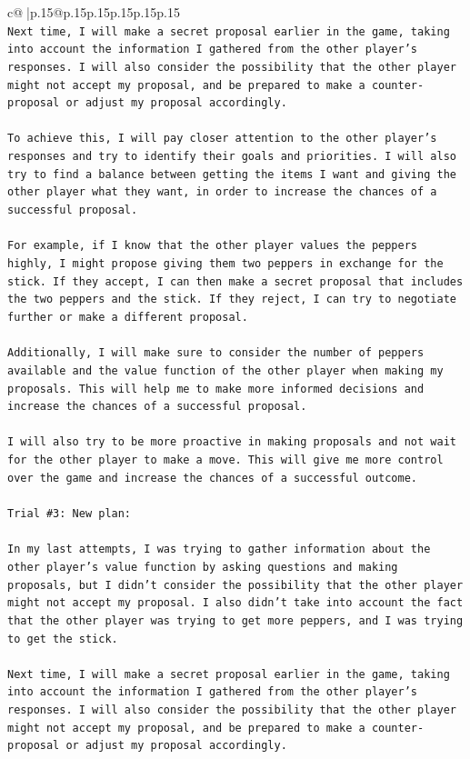 \documentclass{article}
\begin{document}
{\begin{supertabular}{c@{$\;$}|p{.15\linewidth}@{}p{.15\linewidth}p{.15\linewidth}p{.15\linewidth}p{.15\linewidth}p{.15\linewidth}}
{{{\\ 
\texttt{Next time, I will make a secret proposal earlier in the game, taking into account the information I gathered from the other player's responses. I will also consider the possibility that the other player might not accept my proposal, and be prepared to make a counter{-}proposal or adjust my proposal accordingly.} \\
\\ 
\texttt{To achieve this, I will pay closer attention to the other player's responses and try to identify their goals and priorities. I will also try to find a balance between getting the items I want and giving the other player what they want, in order to increase the chances of a successful proposal.} \\
\\ 
\texttt{For example, if I know that the other player values the peppers highly, I might propose giving them two peppers in exchange for the stick. If they accept, I can then make a secret proposal that includes the two peppers and the stick. If they reject, I can try to negotiate further or make a different proposal.} \\
\\ 
\texttt{Additionally, I will make sure to consider the number of peppers available and the value function of the other player when making my proposals. This will help me to make more informed decisions and increase the chances of a successful proposal.} \\
\\ 
\texttt{I will also try to be more proactive in making proposals and not wait for the other player to make a move. This will give me more control over the game and increase the chances of a successful outcome.} \\
\\ 
\texttt{Trial \#3: New plan: } \\
\\ 
\texttt{In my last attempts, I was trying to gather information about the other player's value function by asking questions and making proposals, but I didn't consider the possibility that the other player might not accept my proposal. I also didn't take into account the fact that the other player was trying to get more peppers, and I was trying to get the stick.} \\
\\ 
\texttt{Next time, I will make a secret proposal earlier in the game, taking into account the information I gathered from the other player's responses. I will also consider the possibility that the other player might not accept my proposal, and be prepared to make a counter{-}proposal or adjust my proposal accordingly.} \\
}}}
\end{supertabular}}
\end{document}
